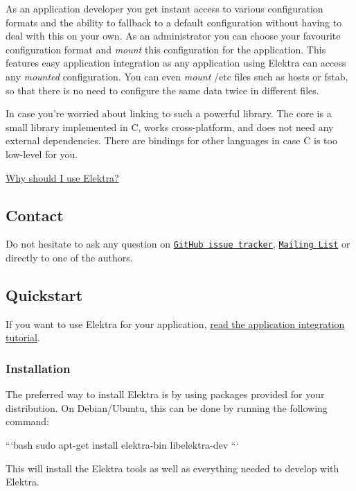 As an application developer you get instant access to various configuration formats and the ability to fallback to a default configuration without having to deal with this on your own. As an administrator you can choose your favourite configuration format and {\itshape mount} this configuration for the application. This features easy application integration as any application using Elektra can access any {\itshape mounted} configuration. You can even {\itshape mount} {\ttfamily /etc} files such as {\ttfamily hosts} or {\ttfamily fstab}, so that there is no need to configure the same data twice in different files.

In case you're worried about linking to such a powerful library. The core is a small library implemented in C, works cross-\/platform, and does not need any external dependencies. There are bindings for other languages in case C is too low-\/level for you.

\hyperlink{doc_WHY_md}{Why should I use Elektra?}

\subsection*{Contact}

Do not hesitate to ask any question on \href{https://github.com/ElektraInitiative/libelektra/issues}{\tt Git\+Hub issue tracker}, \href{https://lists.sourceforge.net/lists/listinfo/registry-list}{\tt Mailing List} or directly to one of the authors.

\subsection*{Quickstart}

If you want to use Elektra for your application, \hyperlink{doc_tutorials_application-integration_md}{read the application integration tutorial}.

\subsubsection*{Installation}

The preferred way to install Elektra is by using packages provided for your distribution. On Debian/\+Ubuntu, this can be done by running the following command\+:

```bash sudo apt-\/get install elektra-\/bin libelektra-\/dev ```

This will install the Elektra tools as well as everything needed to develop with Elektra.

